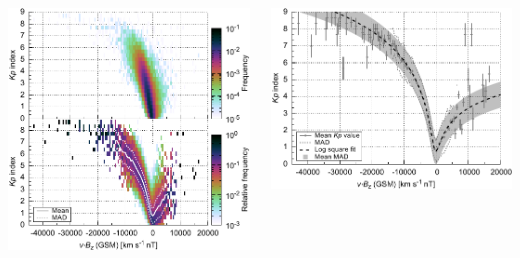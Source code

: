 \documentclass[11pt,aspectratio=1610]{beamer}	%
\newcommand{\captionoftiny}[2]{\captionof{#1}{\color{gray} \tiny #2}}
\begin{document}
\begin{frame}[c]{}{}
	\begin{columns}[c]
		
		\includegraphics[width=\textwidth]{../figures_of_mine/chapter2/Kp_2dhistogram_VBzgsm_sws_e.pdf}


		\includegraphics[width=\textwidth]{../figures_of_mine/chapter2/Kp_2dhistogram_VBzgsm_sws_fit_e.pdf}
	
	\end{columns}
\end{frame}
\end{document}
